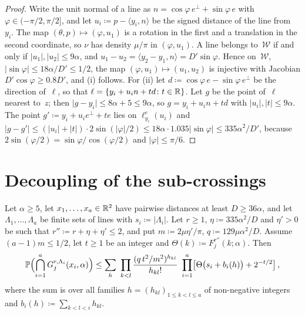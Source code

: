 \documentclass[11pt,letterpaper]{article}
\newcommand{\cW}{\mathcal W}
\begin{document}
\begin{proof}
Write the unit normal of a line as $n=\cos\varphi\,e^\perp+\sin\varphi\,e$ with $\varphi\in(-\pi/2,\pi/2]$, and let $u_i\coloneqq p-\langle y_i,n\rangle$ be the signed distance of the line from~$y_i$. The map $(\theta,p)\mapsto(\varphi,u_1)$ is a rotation in the first and a translation in the second coordinate, so $\nu$ has density $\mu/\pi$ in $(\varphi,u_1)$. A line belongs to~$\cW$ if and only if $\lvert u_1\rvert,\lvert u_2\rvert\le9\alpha$, and $u_1-u_2=\langle y_2-y_1,n\rangle=D'\sin\varphi$. Hence on~$\cW$, $\lvert\sin\varphi\rvert\le18\alpha/D'\le1/2$, the map $(\varphi,u_1)\mapsto(u_1,u_2)$ is injective with Jacobian $D'\cos\varphi\ge0.8D'$, and (i) follows. For (ii) let $d\coloneqq\cos\varphi\,e-\sin\varphi\,e^\perp$ be the direction of~$\ell$, so that $\ell=\{y_i+u_in+td\colon t\in\mathbb R\}$. Let $g$ be the point of~$\ell$ nearest to~$z$; then $\lvert g-y_i\rvert\le8\alpha+5\le9\alpha$, so $g=y_i+u_in+td$ with $\lvert u_i\rvert,\lvert t\rvert\le9\alpha$. The point $g'\coloneqq y_i+u_ie^\perp+te$ lies on $\ell^e_{y_i}(u_i)$ and $\lvert g-g'\rvert\le(\lvert u_i\rvert+\lvert t\rvert)\cdot2\sin(\lvert\varphi\rvert/2)\le18\alpha\cdot1.035\lvert\sin\varphi\rvert\le335\alpha^2/D'$, because $2\sin(\varphi/2)=\sin\varphi/\cos(\varphi/2)$ and $\lvert\varphi\rvert\le\pi/6$.
\end{proof}

\section{Decoupling of the sub-crossings}
\label{sec:decoupling}

\begin{proposition}[Decoupling]
\label{prop:decoupling}
Let $\alpha\ge5$, let $x_1,\dots,x_a\in\mathbb R^2$ have pairwise distances at least $D\ge36\alpha$, and let $\Lambda_1,\dots,\Lambda_a$ be finite sets of lines with $s_i\coloneqq\lvert\Lambda_i\rvert$. Let $r\ge1$, $\eta\coloneqq335\alpha^2/D$ and $\eta'>0$ be such that $r''\coloneqq r+\eta+\eta'\le2$, and put $m\coloneqq2\mu\eta'/\pi$, $q\coloneqq129\mu\alpha^2/D$. Assume $(a-1)m\le1/2$, let $t\ge1$ be an integer and $\Theta(k)\coloneqq F_j^{r''}(k;\alpha)$. Then
\begin{equation}
\label{eq:decoupling}
  \P\Bigl(\bigcap_{i=1}^{a}G_j^{r,\Lambda_i}(x_i,\alpha)\Bigr)\le\sum_{h}\ \prod_{k<l}\frac{(q\,t^2/m^2)^{h_{kl}}}{h_{kl}!}\ \prod_{i=1}^{a}\bigl[\Theta\bigl(s_i+b_i(h)\bigr)+2^{-t/2}\bigr]\,,
\end{equation}
where the sum is over all families $h=(h_{kl})_{1\le k<l\le a}$ of non-negative integers and $b_i(h)\coloneqq\sum_{k<l<i}h_{kl}$.
\end{proposition}
\end{document}
